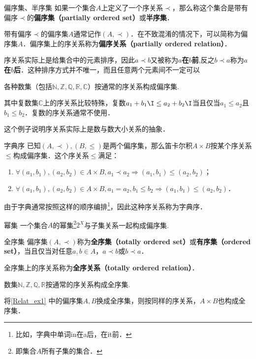 \begin{definition}{偏序集、半序集}
如果一个集合$A$上定义了一个序关系$\prec$，那么称这个集合是带有偏序$\prec$的\textbf{偏序集（partially ordered set）}或\textbf{半序集}．
\end{definition}

带有偏序$\prec$的偏序集$A$通常记作$(A,\prec)$．在不致混淆的情况下，可以简称为偏序集$A$．偏序集上的序关系称为\textbf{偏序关系（partially ordered relation）}．

序关系实际上是给集合中的元素排序，因此$a \prec b$又被称为\textbf{$a$在$b$前},反之$b \prec a$称为\textbf{$a$在$b$后}．这种排序方式并不唯一，而且任意两个元素间不一定可以

\begin{example}{}
各种数集（包括$\mathbb{N},\mathbb{Z},\mathbb{Q},\mathbb{R},\mathbb{C}$）按通常的序关系构成偏序集.

其中复数集$\mathbb{C}$上的序关系比较特殊，复数$a_1+b_1\I \leq a_2+b_2\I$当且仅当$a_1\leq a_2$且$b_1 \leq b_2$．复数的序关系通常不使用．
\end{example}

这个例子说明序关系实际上是数与数大小关系的抽象．

\begin{example}{字典序}\label{Relat_ex1}
已知$(A,\prec),(B,\leq)$是两个偏序集，那么笛卡尔积$A\times B$按某个序关系$\leqslant$构成偏序集．这个序关系$\leqslant$满足：
\begin{enumerate}
\item $\forall(a_1,b_1),(a_2,b_2) \in A\times B, a_1\prec a_2 \Rightarrow (a_1,b_1)\leqslant(a_2,b_2)$；
\item $\forall(a_1,b_1),(a_2,b_2) \in A\times B, a_1=a_2, b_1\leq b_2 \Rightarrow (a_1,b_1) \leqslant (a_2, b_2)$．
\end{enumerate}

由于字典通常按照这样的顺序编排\footnote{比如，字典中单词in在a后，在it前．}，因此这种序关系称为字典序．
\end{example}
\begin{example}{幂集}
一个集合$A$的幂集\footnote{即集合$A$所有子集的集合．}$2^X$与子集关系一起构成偏序集.
\end{example}

\begin{definition}{全序集}
偏序集$(A,\prec)$称为\textbf{全序集（totally ordered set）}或\textbf{有序集（ordered set）}，当且仅当对任意$a,b \in A$，$a \prec b$或$b \prec a$．
\end{definition}
全序集上的序关系称为\textbf{全序关系（totally ordered relation）}．
\begin{example}{}
数集$\mathbb{N},\mathbb{Z},\mathbb{Q},\mathbb{R}$按通常的序关系构成全序集.
\end{example}
\begin{example}{}
将\autoref{Relat_ex1} 中的偏序集$A,B$换成全序集，则按同样的序关系，$A\times B$也构成全序集．
\end{example}

